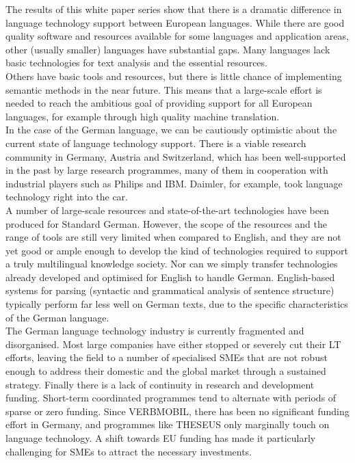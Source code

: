 \begin{multicols}{2}
The results of this white paper series show that there is a dramatic difference in language technology support between  European languages. While there are good quality software and resources available for some languages and application areas, other (usually smaller) languages have substantial gaps. Many languages lack basic technologies for text analysis and the essential resources. \\
Others have basic tools and resources, but there is little chance of implementing semantic methods in the near future. This means that a large-scale effort is needed to reach the ambitious goal of providing support for all European languages, for example through high quality machine translation.\\
In the case of the German language, we can be cautiously optimistic about the current state of language technology support. There is a viable research community in Germany, Austria and Switzerland, which has been well-supported in the past by large research programmes, many of them in cooperation with industrial players such as Philips and IBM. Daimler, for example, took language technology right into the car.\\
A number of large-scale resources and state-of-the-art technologies have been produced for Standard German. However, the scope of the resources and the range of tools are still very limited when compared to English, and they are not yet good or ample enough to develop the kind of technologies required to support a truly multilingual knowledge society. Nor can we simply transfer technologies already developed and optimised for English to handle German.
English-based systems for parsing (syntactic and grammatical analysis of sentence structure) typically perform far less well on German texts, due to the specific characteristics of the German language.\\
The German language technology industry is currently fragmented and disorganised. Most large companies have either stopped or severely cut their LT efforts, leaving the field to a number of specialised SMEs that are not robust enough to address their domestic and the global market through a sustained strategy. Finally there is a lack of continuity in research and development funding. Short-term coordinated programmes tend to alternate with periods of sparse or zero funding. Since VERBMOBIL, there has been no significant funding effort in Germany, and programmes like THESEUS only marginally touch on language technology. A shift towards EU funding has made it particularly challenging for SMEs to attract the necessary investments.\\

\end{multicols}
